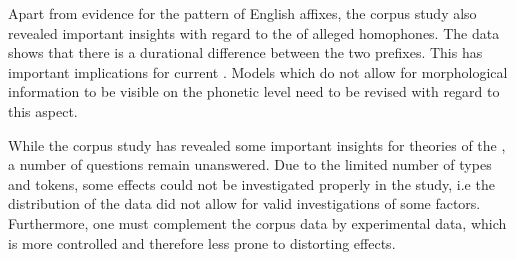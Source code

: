 Apart from evidence for the  pattern of English affixes, the corpus study also revealed important insights with regard to the  of alleged homophones. The data shows that there is a durational difference between the two prefixes. This has important implications for current . Models which do not allow for morphological information to be visible on the phonetic level need to be revised with regard to this aspect.



While the corpus study has revealed some important insights for theories of the , a number of questions remain  unanswered. Due to the limited number of types and tokens, some effects could not be investigated properly in the study, i.e the distribution of the data did not allow for valid investigations of some factors. Furthermore, one must complement the corpus data by experimental data, which is more controlled and therefore less prone to distorting effects.
